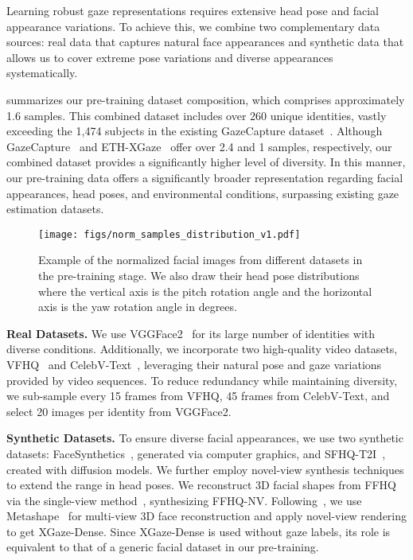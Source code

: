 Learning robust gaze representations requires extensive head pose and facial appearance variations. 
To achieve this, we combine two complementary data sources: real data that captures natural face appearances and synthetic data that allows us to cover extreme pose variations and diverse appearances systematically. 


 summarizes our pre-training dataset composition, which comprises approximately \SI{1.6}{\mega{}} samples.
This combined dataset includes over \SI{260}{\kilo{}} unique identities, vastly exceeding the 1,474 subjects in the existing GazeCapture dataset~\cite{krafka2016eye}. 
Although GazeCapture~\cite{krafka2016eye} and ETH-XGaze~\cite{zhang2020eth} offer over \SI{2.4}{\mega{}} and \SI{1}{\mega{}} samples, respectively, our combined dataset provides a significantly higher level of diversity.
In this manner, our pre-training data offers a significantly broader representation regarding facial appearances, head poses, and environmental conditions, surpassing existing gaze estimation datasets.

\begin{figure*}[t]
  \begin{center}
      \texttt{[image: figs/norm\_samples\_distribution\_v1.pdf]}
      \caption{Example of the normalized facial images from different datasets in the pre-training stage. We also draw their head pose distributions where the vertical axis is the pitch rotation angle and the horizontal axis is the yaw rotation angle in degrees.
      }\label{fig:face_samples_distribution}
  \end{center}
\end{figure*}



\noindent\textbf{Real Datasets.} 
We use VGGFace2~\cite{cao2018vggface2} for its large number of identities with diverse conditions. 
Additionally, we incorporate two high-quality video datasets, VFHQ~\cite{xie2022vfhq} and CelebV-Text~\cite{yu2023celebv}, leveraging their natural pose and gaze variations provided by video sequences. 
To reduce redundancy while maintaining diversity, we sub-sample every 15 frames from VFHQ, 45 frames from CelebV-Text, and select 20 images per identity from VGGFace2. 



\noindent\textbf{Synthetic Datasets.} 
To ensure diverse facial appearances, we use two synthetic datasets: FaceSynthetics~\cite{wood2021fake}, generated via computer graphics, and SFHQ-T2I~\cite{david_beniaguev_2024_SFHQ_T2I}, created with diffusion models. 
We further employ novel-view synthesis techniques to extend the range in head poses.
We reconstruct 3D facial shapes from FFHQ~\cite{Karras2019stylegan2} via the single-view method~\cite{qin2022learning}, synthesizing FFHQ-NV. 
Following~\cite{qin2023domain}, we use Metashape~\cite{agisoft_metashape} for multi-view 3D face reconstruction and apply novel-view rendering to get XGaze-Dense. 
Since XGaze-Dense is used without gaze labels, its role is equivalent to that of a generic facial dataset in our pre-training. 


